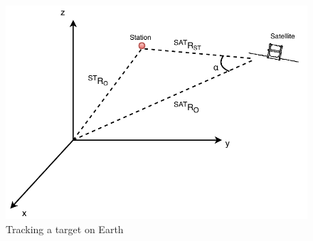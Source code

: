 \begin{figure}[H]
	\centering
	\includegraphics[width=0.7\linewidth]{figures/ST}
	\caption{Tracking a target on Earth }
	\label{fig:TS}
\end{figure}
